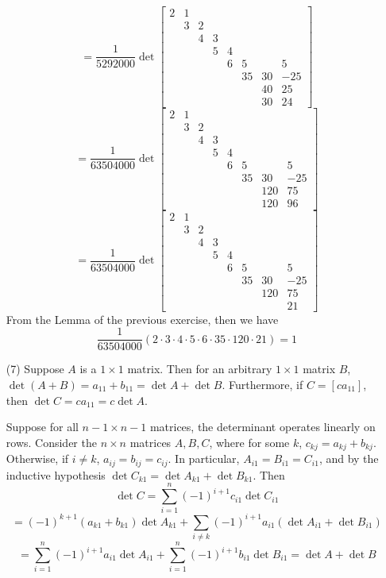 \documentclass[12pt]{article}
\begin{document}
\begin{itemize}
$$= \frac{1}{5292000}\det\begin{bmatrix}
2 & 1 \\
& 3 & 2 \\
& & 4 & 3 \\
& & & 5 & 4 \\
& & & & 6 & 5 & & 5\\
& & & & & 35 & 30 & -25\\
& & & & & & 40 & 25\\
& & & & & & 30 & 24
\end{bmatrix}$$
$$= \frac{1}{63504000}\det\begin{bmatrix}
2 & 1 \\
& 3 & 2 \\
& & 4 & 3 \\
& & & 5 & 4 \\
& & & & 6 & 5 & & 5\\
& & & & & 35 & 30 & -25\\
& & & & & & 120 & 75\\
& & & & & & 120 & 96
\end{bmatrix}$$
$$= \frac{1}{63504000}\det\begin{bmatrix}
2 & 1 \\
& 3 & 2 \\
& & 4 & 3 \\
& & & 5 & 4 \\
& & & & 6 & 5 & & 5\\
& & & & & 35 & 30 & -25\\
& & & & & & 120 & 75\\
& & & & & & & 21
\end{bmatrix}$$
From the Lemma of the previous exercise, then we have
$$\frac{1}{63504000}(2\cdot 3 \cdot 4 \cdot 5 \cdot 6 \cdot 35 \cdot 120 \cdot 21) = 1$$
\item[(7)]
Suppose $A$ is a $1 \times 1$ matrix. Then for an arbitrary $1 \times 1$ matrix $B$, $\det(A + B) = a_{11} + b_{11} = \det A + \det B$. Furthermore, if $C = [ca_{11}]$, then $\det C = ca_{11} = c\det A$.

Suppose for all $n - 1 \times n - 1$ matrices, the determinant operates linearly on rows. Consider the $n \times n$ matrices $A, B, C$, where for some $k$, $c_{kj} = a_{kj} + b_{kj}$. Otherwise, if $i \neq k$, $a_{ij} = b_{ij} = c_{ij}$. In particular, $A_{i1} = B_{i1} = C_{i1}$, and by the inductive hypothesis $\det C_{k1} = \det A_{k1} + \det B_{k1}$. Then
$$\det C = \sum_{i=1}^n (-1)^{i+1}c_{i1}\det C_{i1}$$
$$= (-1)^{k+1}(a_{k1} + b_{k1})\det A_{k1} + \sum_{i \neq k}(-1)^{i+1}a_{i1}(\det A_{i1} + \det B_{i1})$$
$$= \sum_{i=1}^n (-1)^{i+1}a_{i1}\det A_{i1} + \sum_{i=1}^n (-1)^{i+1} b_{i1} \det B_{i1} = \det A + \det B$$


\end{itemize}
\end{document}
